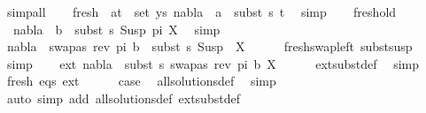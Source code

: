 \begin{isabellebody}
\ simp{\isacharunderscore}{\kern0pt}all\isanewline
\ \ \isamarkupfalse%
\ fresh{\isacharcolon}{\kern0pt}\ {\isachardoublequoteopen}{\isasymforall}\ {\isacharparenleft}{\kern0pt}a{\isacharcomma}{\kern0pt}t{\isacharparenright}{\kern0pt}\ {\isasymin}\ set\ ys{\isachardot}{\kern0pt}\ nabla{}\ {\isasymturnstile}\ a\ {\isasymsharp}\ subst\ s{}\ t{\isachardoublequoteclose}\ \isamarkupfalse%
\ simp\isanewline
\ \ \isamarkupfalse%
\ fresh{\isacharunderscore}{\kern0pt}old\ \isamarkupfalse%
\isanewline
\ \ {\isachardoublequoteopen}nabla{}\ {\isasymturnstile}\ b\ {\isasymsharp}\ subst\ s{}\ {\isacharparenleft}{\kern0pt}Susp\ pi\ X{\isacharparenright}{\kern0pt}{\isachardoublequoteclose}\ \isamarkupfalse%
\ simp\isanewline
\ \ \isamarkupfalse%
\ {\isachardoublequoteopen}nabla{}\ {\isasymturnstile}\ swapas\ {\isacharparenleft}{\kern0pt}rev\ pi{\isacharparenright}{\kern0pt}\ b\ {\isasymsharp}\ subst\ s{}\ {\isacharparenleft}{\kern0pt}Susp\ {\isacharbrackleft}{\kern0pt}{\isacharbrackright}{\kern0pt}\ X{\isacharparenright}{\kern0pt}{\isachardoublequoteclose}\isanewline
\ \ \ \ \isamarkupfalse%
\ fresh{\isacharunderscore}{\kern0pt}swap{\isacharunderscore}{\kern0pt}left\ subst{\isacharunderscore}{\kern0pt}susp\ \isamarkupfalse%
\ simp\isanewline
\ \ \isamarkupfalse%
\ ext{\isacharcolon}{\kern0pt}\ {\isachardoublequoteopen}nabla{}\ {\isasymTurnstile}\ {\isacharparenleft}{\kern0pt}subst\ s{}{\isacharparenright}{\kern0pt}\ {\isacharbraceleft}{\kern0pt}{\isacharparenleft}{\kern0pt}swapas\ {\isacharparenleft}{\kern0pt}rev\ pi{\isacharparenright}{\kern0pt}\ b{\isacharcomma}{\kern0pt}\ X{\isacharparenright}{\kern0pt}{\isacharbraceright}{\kern0pt}{\isachardoublequoteclose}\isanewline
\ \ \ \ \isamarkupfalse%
\ ext{\isacharunderscore}{\kern0pt}subst{\isacharunderscore}{\kern0pt}def\ \isamarkupfalse%
\ simp\isanewline
\ \ \isamarkupfalse%
\ fresh\ eqs\ ext\isanewline
\ \ \ \ \isamarkupfalse%
\ {\isacharquery}{\kern0pt}case\ \isamarkupfalse%
\ all{\isacharunderscore}{\kern0pt}solutions{\isacharunderscore}{\kern0pt}def\ \isamarkupfalse%
\ simp\isanewline
{}\isamarkupfalse%
\ {\isacharparenleft}{\kern0pt}auto\ simp\ add{\isacharcolon}{\kern0pt}\ all{\isacharunderscore}{\kern0pt}solutions{\isacharunderscore}{\kern0pt}def\ ext{\isacharunderscore}{\kern0pt}subst{\isacharunderscore}{\kern0pt}def{\isacharparenright}{\kern0pt}%

\end{isabellebody}
